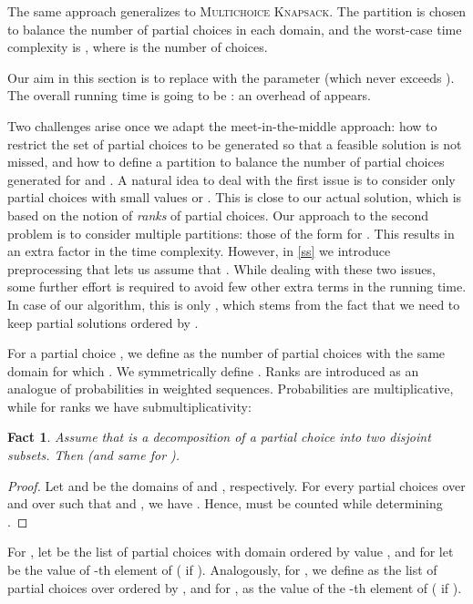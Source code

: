 \documentclass{article}
\theoremstyle{plain}
\newtheorem{fact}[theorem]{Fact}
\theoremstyle{definition}
\newcommand{\MK}{\textsc{Multichoice Knapsack}\xspace}
\begin{document}
  The same approach generalizes to \MK. 
  The partition is chosen to balance the number of partial choices
  in each domain, and the worst-case time complexity is , where  is the number of choices.
  
  Our aim in this section is to replace  with the parameter  (which never exceeds ).
  The overall running time is going to be  : an overhead  of  appears.


  Two challenges arise once we adapt the meet-in-the-middle approach:
  how to restrict the set of partial choices to be generated so that a feasible solution is not missed,
  and how to define a partition  to balance the number of partial choices generated for  and .
  A natural idea to deal with the first issue is to consider only partial choices with small values  or .
  This is close to our actual solution, which is based on the notion of \emph{ranks} of partial choices.
  Our approach to the second problem is to consider multiple partitions: those of the form  for .
  This results in an extra  factor in the time complexity.
  However, in \cref{ss} we introduce preprocessing that lets us assume that .
  While dealing with these two issues, some further effort is required to avoid few other extra terms in the running time.
  In case of our algorithm, this is only , which stems from the fact that we need to keep partial solutions ordered by . 
  
  
    For a partial choice , we define  as the number of partial choices  with the same domain for which . 
    We symmetrically define .
    Ranks are introduced as an analogue of probabilities in weighted sequences.
    Probabilities are multiplicative, while for ranks we have submultiplicativity:
      
    \begin{fact}\label{fct:comb}
      Assume that  is a decomposition of a partial choice  into two disjoint subsets.
      Then  (and same for ).
    \end{fact}
    \begin{proof}
      Let  and  be the domains of  and , respectively.
      For every partial choices  over  and  over  such that  and , we have
      .
      Hence,  must be counted while determining .
    \end{proof}
  
  
      
   For , let  be the list of partial choices with domain  ordered by value ,
   and for  let  be the value  of -th element of  ( if ).
  Analogously, for , we define  as the list of partial choices over  ordered by ,
  and for ,  as the value of the -th element of  ( if ).
  
\end{document}
